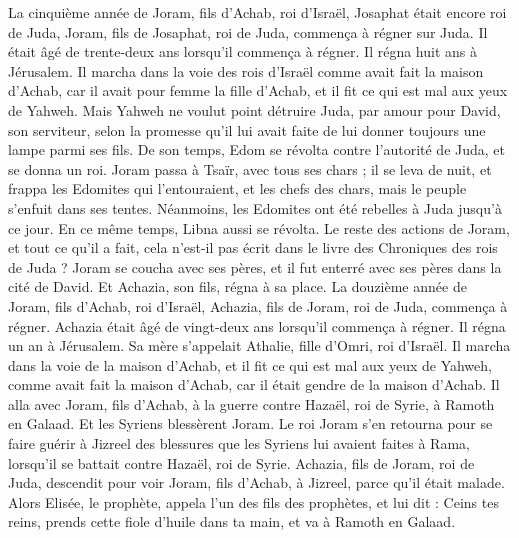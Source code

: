 \begin{multicols}{2}
La cinquième année de Joram, fils d’Achab, roi d’Israël, Josaphat était encore roi de Juda, Joram, fils de Josaphat, roi de Juda, commença à régner sur Juda.
Il était âgé de trente-deux ans lorsqu’il commença à régner. Il régna huit ans à Jérusalem.
Il marcha dans la voie des rois d’Israël comme avait fait la maison d’Achab, car il avait pour femme la fille d’Achab, et il fit ce qui est mal aux yeux de Yahweh.
Mais Yahweh ne voulut point détruire Juda, par amour pour David, son serviteur, selon la promesse qu’il lui avait faite de lui donner toujours une lampe parmi ses fils.
De son temps, Edom se révolta contre l’autorité de Juda, et se donna un roi.
Joram passa à Tsaïr, avec tous ses chars ; il se leva de nuit, et frappa les Edomites qui l’entouraient, et les chefs des chars, mais le peuple s’enfuit dans ses tentes.
Néanmoins, les Edomites ont été rebelles à Juda jusqu’à ce jour. En ce même temps, Libna aussi se révolta.
Le reste des actions de Joram, et tout ce qu’il a fait, cela n’est-il pas écrit dans le livre des Chroniques des rois de Juda ?
Joram se coucha avec ses pères, et il fut enterré avec ses pères dans la cité de David. Et Achazia, son fils, régna à sa place.
La douzième année de Joram, fils d’Achab, roi d’Israël, Achazia, fils de Joram, roi de Juda, commença à régner.
Achazia était âgé de vingt-deux ans lorsqu’il commença à régner. Il régna un an à Jérusalem. Sa mère s’appelait Athalie, fille d’Omri, roi d’Israël.
Il marcha dans la voie de la maison d’Achab, et il fit ce qui est mal aux yeux de Yahweh, comme avait fait la maison d’Achab, car il était gendre de la maison d’Achab.
Il alla avec Joram, fils d’Achab, à la guerre contre Hazaël, roi de Syrie, à Ramoth en Galaad. Et les Syriens blessèrent Joram.
Le roi Joram s’en retourna pour se faire guérir à Jizreel des blessures que les Syriens lui avaient faites à Rama, lorsqu’il se battait contre Hazaël, roi de Syrie. Achazia, fils de Joram, roi de Juda, descendit pour voir Joram, fils d’Achab, à Jizreel, parce qu’il était malade.
\VerseOne{}Alors Elisée, le prophète, appela l’un des fils des prophètes, et lui dit : Ceins tes reins, prends cette fiole d’huile dans ta main, et va à Ramoth en Galaad.

\end{multicols}
